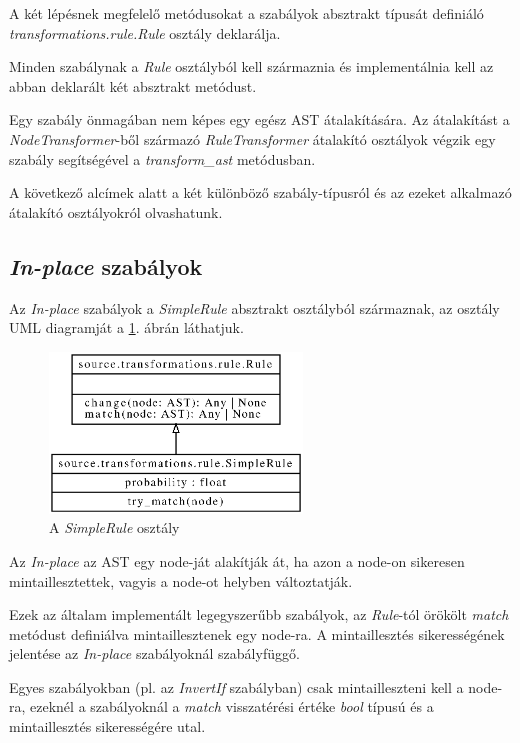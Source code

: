 A két lépésnek megfelelő metódusokat a szabályok absztrakt típusát definiáló
\emph{transformations.rule.Rule} osztály deklarálja.

Minden szabálynak a \emph{Rule} osztályból kell származnia és implementálnia kell
az abban deklarált két absztrakt metódust.

Egy szabály önmagában nem képes egy egész AST átalakítására.
Az átalakítást a \emph{NodeTransformer}-ből származó \emph{RuleTransformer}
átalakító osztályok végzik egy szabály segítségével a \emph{transform\_ast} metódusban.

A következő alcímek alatt a két különböző szabály-típusról és az ezeket alkalmazó
átalakító osztályokról olvashatunk.

\subsection{\emph{In-place} szabályok}

Az \emph{In-place} szabályok a \emph{SimpleRule} absztrakt osztályból származnak,
az osztály UML diagramját a \ref{fig:SimpleRule}. ábrán láthatjuk.

\begin{figure}[H]
	\centering
	\includegraphics[width=0.6\textwidth]{images/uml/SimpleRule.eps}
	\caption{A \emph{SimpleRule} osztály}
	\label{fig:SimpleRule}
\end{figure}

Az \emph{In-place} az AST egy node-ját alakítják át,
ha azon a node-on sikeresen mintaillesztettek, vagyis a node-ot helyben változtatják.

Ezek az általam implementált legegyszerűbb szabályok,
az \emph{Rule}-tól örökölt \emph{match} metódust definiálva mintaillesztenek egy node-ra.
A mintaillesztés sikerességének jelentése az \emph{In-place} szabályoknál szabályfüggő.

Egyes szabályokban (pl. az \emph{InvertIf} szabályban) csak mintailleszteni kell a node-ra,
ezeknél a szabályoknál a \emph{match} visszatérési értéke \emph{bool} típusú
és a mintaillesztés sikerességére utal.

